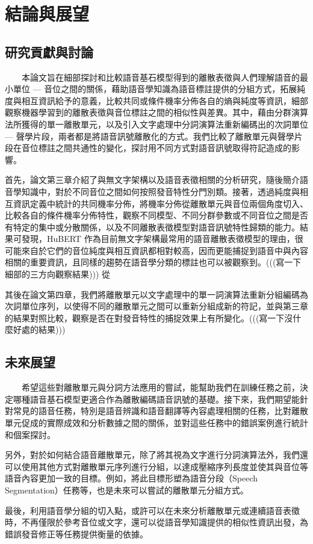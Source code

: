 \chapter{結論與展望} 

\section{研究貢獻與討論}

　　本論文旨在細部探討和比較語音基石模型得到的離散表徵與人們理解語音的最小單位 --- 音位之間的關係，藉助語音學知識為語音標註提供的分組方式，拓展純度與相互資訊給予的意義，比較共同或條件機率分佈各自的熵與純度等資訊，細部觀察機器學習到的離散表徵與音位標註之間的相似性與差異。其中，藉由分群演算法所獲得的單一離散單元，以及引入文字處理中分詞演算法重新編碼出的次詞單位 --- 聲學片段，兩者都是將語音訊號離散化的方式。我們比較了離散單元與聲學片段在音位標註之間共通性的變化，探討用不同方式對語音訊號取得符記造成的影響。

        首先，論文第三章介紹了與無文字架構以及語音表徵相關的分析研究，隨後簡介語音學知識中，對於不同音位之間如何按照發音特性分門別類。接著，透過純度與相互資訊定義中統計的共同機率分佈，將機率分佈從離散單元與音位兩個角度切入、比較各自的條件機率分佈特性，觀察不同模型、不同分群參數或不同音位之間是否有特定的集中或分散關係，以及不同離散表徵模型對語音訊號特性歸類的能力。結果可發現，HuBERT 作為目前無文字架構最常用的語音離散表徵模型的理由，很可能來自於它們的音位純度與相互資訊都相對較高，因而更能捕捉到語音中與內容相關的重要資訊，且同樣的趨勢在語音學分類的標註也可以被觀察到。(((寫一下細部的三方向觀察結果)))
從

        其後在論文第四章，我們將離散單元以文字處理中的單一詞演算法重新分組編碼為次詞單位序列，以使得不同的離散單元之間可以重新分組成新的符記，並與第三章的結果對照比較，觀察是否在對發音特性的捕捉效果上有所變化。(((寫一下沒什麼好處的結果)))

\section{未來展望}

　　希望這些對離散單元與分詞方法應用的嘗試，能幫助我們在訓練任務之前，決定哪種語音基石模型更適合作為離散編碼語音訊號的基礎。接下來，我們期望能針對常見的語音任務，特別是語音辨識和語音翻譯等內容處理相關的任務，比對離散單元促成的實際成效和分析數據之間的關係，並對這些任務中的錯誤案例進行統計和個案探討。

        另外，對於如何結合語音離散單元，除了將其視為文字進行分詞演算法外，我們還可以使用其他方式對離散單元序列進行分組，以達成壓縮序列長度並使其與音位等語音內容更加一致的目標。例如，將此目標形塑為語音分段（Speech Segmentation）任務等，也是未來可以嘗試的離散單元分組方式。

        最後，利用語音學分組的切入點，或許可以在未來分析離散單元或連續語音表徵時，不再僅限於參考音位或文字，還可以從語音學知識提供的相似性資訊出發，為錯誤發音修正等任務提供衡量的依據。
